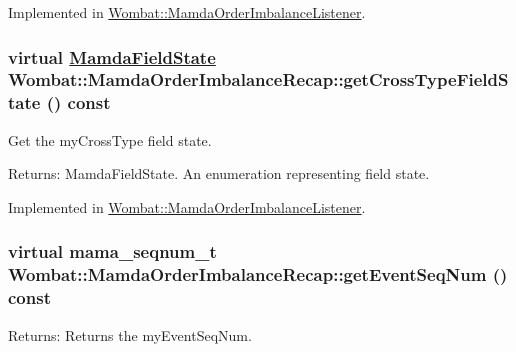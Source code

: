 Implemented in \hyperlink{classWombat_1_1MamdaOrderImbalanceListener_068ff249e302d5490189e747622fae22}{Wombat::Mamda\-Order\-Imbalance\-Listener}.\hypertarget{classWombat_1_1MamdaOrderImbalanceRecap_be84e053623cff05c86acfabcb0a77a8}{
\subsubsection[getCrossTypeFieldState]{\setlength{\rightskip}{0pt plus 5cm}virtual \hyperlink{namespaceWombat_93aac974f2ab713554fd12a1fa3b7d2a}{Mamda\-Field\-State} Wombat::Mamda\-Order\-Imbalance\-Recap::get\-Cross\-Type\-Field\-State () const}}
\label{classWombat_1_1MamdaOrderImbalanceRecap_be84e053623cff05c86acfabcb0a77a8}


Get the my\-Cross\-Type field state. 

\begin{Desc}
\item[Returns:]Mamda\-Field\-State. An enumeration representing field state. \end{Desc}


Implemented in \hyperlink{classWombat_1_1MamdaOrderImbalanceListener_ad35a45f28ab61abc265d15c76a26c37}{Wombat::Mamda\-Order\-Imbalance\-Listener}.\hypertarget{classWombat_1_1MamdaOrderImbalanceRecap_f49f74200cc7ca60a7509f4801a1f74e}{
\subsubsection[getEventSeqNum]{\setlength{\rightskip}{0pt plus 5cm}virtual mama\_\-seqnum\_\-t Wombat::Mamda\-Order\-Imbalance\-Recap::get\-Event\-Seq\-Num () const}}
\label{classWombat_1_1MamdaOrderImbalanceRecap_f49f74200cc7ca60a7509f4801a1f74e}


\begin{Desc}
\item[Returns:]Returns the my\-Event\-Seq\-Num. \end{Desc}


